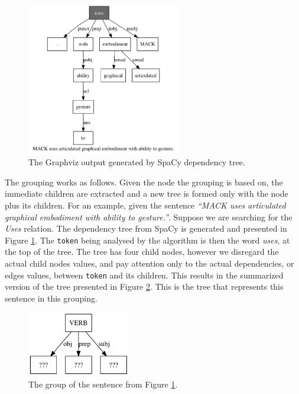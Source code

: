 \documentclass[11pt,a4paper,openright]{memoir}
\begin{document}
\begin{figure}[!htbp]
  \centering
    \includegraphics[width=0.6\textwidth]{./images/sentence-91-37}
  \caption[The Graphviz output generated by SpaCy dependency tree.]{The Graphviz output generated by SpaCy dependency tree.}
  \label{fig:tree_output}
\end{figure}

The grouping works as follows. Given the node the grouping is based on, the immediate children are extracted and a new tree is formed only with the node plus its children. For an example, given the sentence \emph{\enquote{MACK uses articulated graphical embodiment with ability to gesture.}}. Suppose we are searching for the \emph{Uses} relation. The dependency tree from SpaCy is generated and presented in Figure \ref{fig:tree_output}. The \texttt{token} being analysed by the algorithm is then the word \emph{uses}, at the top of the tree. The tree has four child nodes, however we disregard the actual child nodes values, and pay attention only to the actual dependencies, or edges values, between \texttt{token} and its children. This results in the summarized version of the tree presented in Figure \ref{fig:group_output_2}. This is the tree that represents this sentence in this grouping.

\begin{figure}[!htbp]
  \centering
    \includegraphics[width=0.4\textwidth]{./images/command-simplified-group-uses-3}
  \caption[The group of the sentence.]{The group of the sentence from Figure \ref{fig:tree_output}.}
  \label{fig:group_output_2}
\end{figure}
\end{document}
